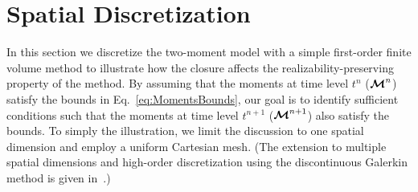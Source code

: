 \section{Spatial Discretization}\label{se:SpacialDiscretization}

In this section we discretize the two-moment model with a simple first-order finite volume method to illustrate how the closure affects the realizability-preserving property of the method.  
By assuming that the moments at time level $t^{n}$ ($\boldsymbol{\mathcal{M}}^{n}$) satisfy the bounds in Eq.~\eqref{eq:MomentsBounds}, our goal is to identify sufficient conditions such that the moments at time level $t^{n+1}$ ($\boldsymbol{\mathcal{M}}^{n+1}$) also satisfy the bounds.  
To simply the illustration, we limit the discussion to one spatial dimension and employ a uniform Cartesian mesh.  
(The extension to multiple spatial dimensions and high-order discretization using the discontinuous Galerkin method is given in~\cite{chu_etal_2018}.)

